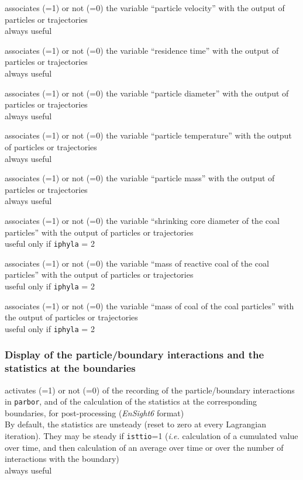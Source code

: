 {associates (=1) or not (=0) the variable ``particle velocity''
with the output of particles or trajectories\\
always useful}

{associates (=1) or not (=0) the variable ``residence time''
with the output of particles or trajectories\\
always useful}

{associates (=1) or not (=0) the variable ``particle diameter''
with the output of particles or trajectories\\
always useful}

{associates (=1) or not (=0) the variable ``particle temperature''
with the output of particles or trajectories\\
always useful}

{associates (=1) or not (=0) the variable ``particle mass''
with the output of particles or trajectories\\
always useful}

{associates (=1) or not (=0) the variable ``shrinking core diameter of
the coal particles'' with the output of particles or trajectories\\
useful only if \texttt{iphyla} = 2}

{associates (=1) or not (=0) the variable ``mass of reactive coal of the
coal particles'' with the output of particles or trajectories\\
useful only if \texttt{iphyla} = 2}

{associates (=1) or not (=0) the variable ``mass of coal of the
coal particles'' with the output of particles or trajectories\\
useful only if \texttt{iphyla} = 2}

\subsubsection{Display of the particle/boundary interactions and the statistics at the boundaries}

{activates (=1) or not (=0) of the recording of the particle/boundary
interactions in  \texttt{parbor}, and of the calculation of the
statistics at the corresponding boundaries, for post-processing
(\textit{EnSight6} format)\\
By default, the statistics are unsteady (reset to zero at every
Lagrangian iteration). They may be steady if \texttt{isttio}=1 ({\em i.e.}
calculation of a cumulated value over time, and then calculation of an
average over time or over the number of interactions with the boundary)\\
always useful}


